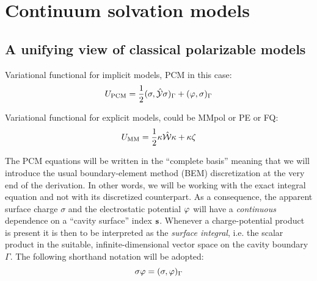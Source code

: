 \chapter{Continuum solvation models}\label{ch:CSM}

\section{A unifying view of classical polarizable models}

Variational functional for implicit models, \acs{PCM} in this case:
\begin{equation}
 U_\mathrm{PCM} = \frac{1}{2}(\sigma, \hat{\mathcal{Y}}\sigma)_{\Gamma} + (\varphi, \sigma)_{\Gamma}
\end{equation}

Variational functional for explicit models, could be MMpol or PE or FQ:
\begin{equation}
  U_\mathrm{MM} = \frac{1}{2}\kappa\hat{\mathcal{W}}\kappa + \kappa\zeta
\end{equation}

The PCM equations will be written in the ``complete basis'' meaning that
we will introduce the usual boundary-element method (BEM) discretization
at the very end of the derivation. In other words, we will be working
with the exact integral equation and not with its discretized
counterpart. As a consequence, the apparent surface charge $\sigma$ and
the electrostatic potential $\varphi$ will have a \emph{continuous}
dependence on a ``cavity surface'' index $\mathbf{s}$. Whenever a
charge-potential product is present it is then to be interpreted as the
\emph{surface integral}, i.e. the scalar product in the suitable,
infinite-dimensional vector space on the cavity boundary $\Gamma$. The
following shorthand notation will be adopted:
\begin{equation}
 \sigma\varphi = (\sigma, \varphi)_{\Gamma}
\end{equation}

